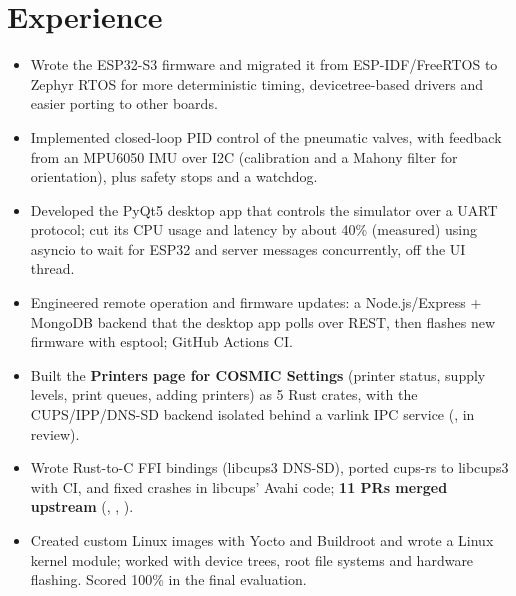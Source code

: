 \documentclass[10pt]{article}
\begin{document}
\section*{Experience}
\begin{itemize}
  \item Wrote the ESP32-S3 firmware and migrated it from ESP-IDF/FreeRTOS to Zephyr RTOS for more deterministic timing, devicetree-based drivers and easier porting to other boards.
  \item Implemented closed-loop PID control of the pneumatic valves, with feedback from an MPU6050 IMU over I2C (calibration and a Mahony filter for orientation), plus safety stops and a watchdog.
  \item Developed the PyQt5 desktop app that controls the simulator over a UART protocol; cut its CPU usage and latency by about 40\% (measured) using asyncio to wait for ESP32 and server messages concurrently, off the UI thread.
  \item Engineered remote operation and firmware updates: a Node.js/Express + MongoDB backend that the desktop app polls over REST, then flashes new firmware with esptool; GitHub Actions CI.
\end{itemize}
\begin{itemize}
  \item Built the \textbf{Printers page for COSMIC Settings} (printer status, supply levels, print queues, adding printers) as 5 Rust crates, with the CUPS/IPP/DNS-SD backend isolated behind a varlink IPC service (, in review).
  \item Wrote Rust-to-C FFI bindings (libcups3 DNS-SD), ported cups-rs to libcups3 with CI, and fixed crashes in libcups' Avahi code; \textbf{11 PRs merged upstream} (, , ).
\end{itemize}
\begin{itemize}
  \item Created custom Linux images with Yocto and Buildroot and wrote a Linux kernel module; worked with device trees, root file systems and hardware flashing. Scored 100\% in the final evaluation.
\end{itemize}
\end{document}

